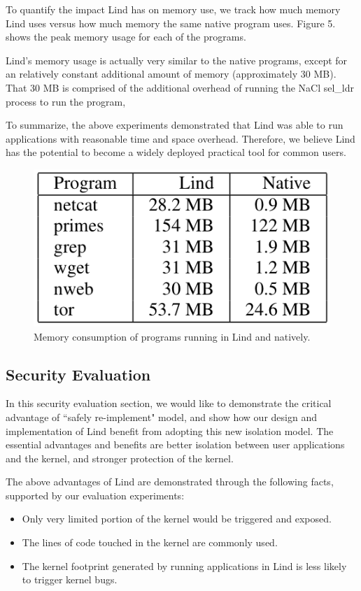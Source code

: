 To quantify the impact Lind has on memory use, we track how much memory Lind uses versus how much memory 
the same native program uses. Figure 5. shows the peak memory usage for each of the programs.

Lind's memory usage is actually very similar to the native programs, except for an relatively constant additional 
amount of memory (approximately 30 MB). That 30 MB is comprised of the additional overhead of running the NaCl 
sel\_ldr process to run the program, 


To summarize, the above experiments demonstrated that Lind was able to run applications with reasonable time and 
space overhead. Therefore, we believe Lind has the potential to become a widely deployed practical tool for 
common users. 


\begin{figure}[h]
\centering
\includegraphics[width=0.6\columnwidth]{diagram/evaluation_03.png}
\caption{Memory consumption of programs running in Lind and natively.}
\label{fig:arch}
\end{figure}


\subsection{Security Evaluation}

In this security evaluation section, we would like to demonstrate the critical advantage of ``safely re-implement" model, 
and show how our design and implementation of Lind benefit from adopting this new isolation model. 
The essential advantages and benefits are better isolation between user applications and the kernel, and stronger 
protection of the kernel. 

The above advantages of Lind are demonstrated through the following facts, supported by our evaluation experiments:

\begin{itemize}  
  \item Only very limited portion of the kernel would be triggered and exposed.   
  \item The lines of code touched in the kernel are commonly used.  
  \item The kernel footprint generated by running applications in Lind is less likely to trigger kernel bugs. 
\end{itemize}


